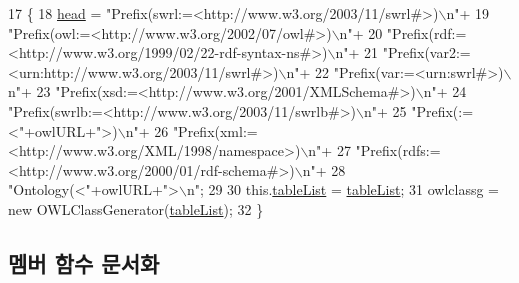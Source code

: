 \begin{DoxyCode}
17                                                                         \{
18         \mbox{\hyperlink{classcom_1_1github_1_1aites_1_1framework_1_1ruleset_1_1_rule_set_generator_a571e3c391cc48fdfdd9cc286988317fe}{head}} =  \textcolor{stringliteral}{"Prefix(swrl:=<http://www.w3.org/2003/11/swrl#>)\(\backslash\)n"}+
19                 \textcolor{stringliteral}{"Prefix(owl:=<http://www.w3.org/2002/07/owl#>)\(\backslash\)n"}+
20                 \textcolor{stringliteral}{"Prefix(rdf:=<http://www.w3.org/1999/02/22-rdf-syntax-ns#>)\(\backslash\)n"}+
21                 \textcolor{stringliteral}{"Prefix(var2:=<urn:http://www.w3.org/2003/11/swrl#>)\(\backslash\)n"}+
22                 \textcolor{stringliteral}{"Prefix(var:=<urn:swrl#>)\(\backslash\)n"}+
23                 \textcolor{stringliteral}{"Prefix(xsd:=<http://www.w3.org/2001/XMLSchema#>)\(\backslash\)n"}+
24                 \textcolor{stringliteral}{"Prefix(swrlb:=<http://www.w3.org/2003/11/swrlb#>)\(\backslash\)n"}+
25                 \textcolor{stringliteral}{"Prefix(:=<"}+owlURL+\textcolor{stringliteral}{">)\(\backslash\)n"}+
26                 \textcolor{stringliteral}{"Prefix(xml:=<http://www.w3.org/XML/1998/namespace>)\(\backslash\)n"}+
27                 \textcolor{stringliteral}{"Prefix(rdfs:=<http://www.w3.org/2000/01/rdf-schema#>)\(\backslash\)n"}+
28                 \textcolor{stringliteral}{"Ontology(<"}+owlURL+\textcolor{stringliteral}{">\(\backslash\)n"};
29         
30         this.\mbox{\hyperlink{classcom_1_1github_1_1aites_1_1framework_1_1ruleset_1_1_rule_set_generator_ac7d8dddafc874c8c1d0bdedfec634d6d}{tableList}} = \mbox{\hyperlink{classcom_1_1github_1_1aites_1_1framework_1_1ruleset_1_1_rule_set_generator_ac7d8dddafc874c8c1d0bdedfec634d6d}{tableList}};
31         owlclassg = \textcolor{keyword}{new} OWLClassGenerator(\mbox{\hyperlink{classcom_1_1github_1_1aites_1_1framework_1_1ruleset_1_1_rule_set_generator_ac7d8dddafc874c8c1d0bdedfec634d6d}{tableList}});
32     \}
\end{DoxyCode}


\subsection{멤버 함수 문서화}
\mbox{\label{classcom_1_1github_1_1aites_1_1framework_1_1ruleset_1_1_rule_set_generator_ad0255e0849361313411b61576c1b9360}} 
